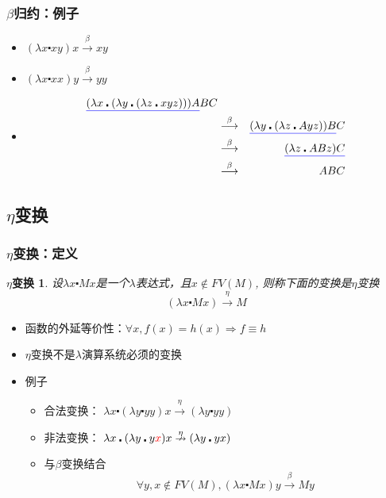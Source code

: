 \documentclass[CJKutf8,compress,hyperref]{beamer}
\begin{document}
\begin{CJK}{UTF8}{song}
\begin{frame}
  \frametitle{$\beta$归约：例子} 
  \begin{itemize}
  \item $(\lambda x \centerdot xy) x \stackrel{\beta}{\longrightarrow} xy$
  \item $(\lambda x \centerdot xx) y \stackrel{\beta}{\longrightarrow} yy$
  \item  
  \begin{eqnarray*}
    {\color{blue}\underline{{\color{black}(\lambda x \centerdot (\lambda y \centerdot (\lambda z \centerdot xyz)))A}}}BC & & \\
                                & \stackrel{\beta}{\longrightarrow} & {\color{blue}\underline{{\color{black}(\lambda y \centerdot (\lambda z \centerdot Ayz))B}}}C \\
  & \stackrel{\beta}{\longrightarrow} & {\color{blue}\underline{{\color{black}(\lambda z \centerdot ABz)C}}} \\ 
  & \stackrel{\beta}{\longrightarrow} & ABC 
  \end{eqnarray*} 
  \end{itemize}
\end{frame} 

\subsection{ $\eta$变换}
\begin{frame}
  \frametitle{$\eta$变换：定义} 
  \newtheorem{etaRed}{$\eta$变换} 
  \begin{etaRed}
    设$\lambda x \centerdot Mx$是一个$\lambda$表达式，且$x \not \in FV(M)$, 则称下面的变换是{\color{red}$\eta$变换}
    \begin{displaymath}
      (\lambda x \centerdot Mx) \stackrel{\eta}{\longrightarrow} M 
    \end{displaymath} 
  \end{etaRed}
  \begin{itemize}
  \item 函数的外延等价性：$\forall x, f(x) = h(x) \Longrightarrow f \equiv h$  
  \item $\eta$变换不是$\lambda$演算系统必须的变换 
  \item 例子 
    \begin{itemize}
    \item{合法变换：} $\lambda x \centerdot (\lambda y \centerdot yy) x \stackrel{\eta}{\longrightarrow}(\lambda y \centerdot yy)$ 
    \item{非法变换：}  $\lambda x \centerdot (\lambda y \centerdot y{\color{red}x}) x \stackrel{\eta}{\nrightarrow}(\lambda y \centerdot yx) $
    \item 与$\beta$变换结合
      \begin{displaymath}
        \forall y, x \not \in FV(M), (\lambda x \centerdot Mx)y \stackrel{\beta}{\longrightarrow} My
      \end{displaymath}
    \end{itemize}
  \end{itemize}
\end{frame} 


\end{CJK}
\end{document}
